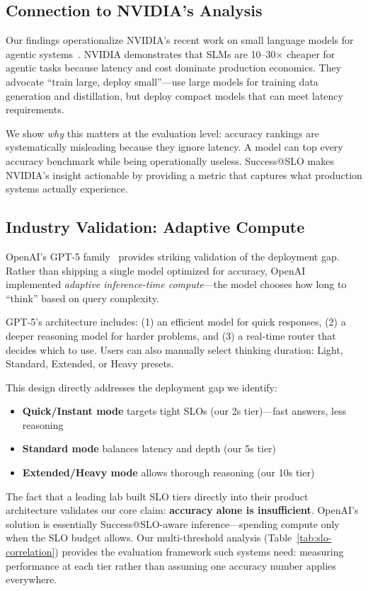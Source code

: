 \documentclass[11pt]{article}
\begin{document}
\subsection{Connection to NVIDIA's Analysis}

Our findings operationalize NVIDIA's recent work on small language models for agentic systems~\citep{nvidia2025slm}.
NVIDIA demonstrates that SLMs are 10--30$\times$ cheaper for agentic tasks because latency and cost dominate production economics.
They advocate ``train large, deploy small''---use large models for training data generation and distillation, but deploy compact models that can meet latency requirements.

We show \emph{why} this matters at the evaluation level: accuracy rankings are systematically misleading because they ignore latency.
A model can top every accuracy benchmark while being operationally useless.
Success@SLO makes NVIDIA's insight actionable by providing a metric that captures what production systems actually experience.

\subsection{Industry Validation: Adaptive Compute}

OpenAI's GPT-5 family~\citep{openai2025gpt5} provides striking validation of the deployment gap.
Rather than shipping a single model optimized for accuracy, OpenAI implemented \emph{adaptive inference-time compute}---the model chooses how long to ``think'' based on query complexity.

GPT-5's architecture includes: (1) an efficient model for quick responses, (2) a deeper reasoning model for harder problems, and (3) a real-time router that decides which to use.
Users can also manually select thinking duration: Light, Standard, Extended, or Heavy presets.

This design directly addresses the deployment gap we identify:
\begin{itemize}[leftmargin=12pt]
    \item \textbf{Quick/Instant mode} targets tight SLOs (our 2s tier)---fast answers, less reasoning
    \item \textbf{Standard mode} balances latency and depth (our 5s tier)
    \item \textbf{Extended/Heavy mode} allows thorough reasoning (our 10s tier)
\end{itemize}

The fact that a leading lab built SLO tiers directly into their product architecture validates our core claim: \textbf{accuracy alone is insufficient}.
OpenAI's solution is essentially Success@SLO-aware inference---spending compute only when the SLO budget allows.
Our multi-threshold analysis (Table~\ref{tab:slo-correlation}) provides the evaluation framework such systems need: measuring performance at each tier rather than assuming one accuracy number applies everywhere.
\end{document}
